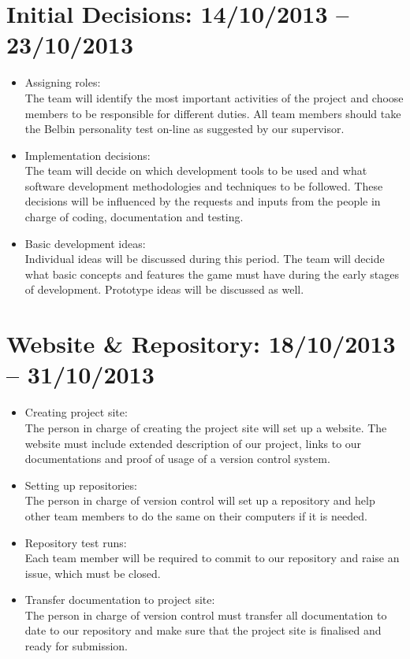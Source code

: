 \section{Initial Decisions: 14/10/2013 -- 23/10/2013} 
\begin{itemize}
\item{Assigning roles:\\The team will identify the most important activities of the project and choose members to be responsible for different duties. All team members should take the Belbin personality test on-line as suggested by our supervisor.}

\item{Implementation decisions:\\The team will decide on which development tools to be used and what software development methodologies and techniques to be followed. These decisions will be influenced by the requests and inputs from the people in charge of coding, documentation and testing.}

\item{Basic development ideas:\\Individual ideas will be discussed during this period. The team will decide what basic concepts and features the game must have during the early stages of development. Prototype ideas will be discussed as well.}
\end{itemize}

\section{Website \& Repository: 18/10/2013 -- 31/10/2013}
\begin{itemize}
\item{Creating project site:\\The person in charge of creating the project site will set up a website. The website must include extended description of our project, links to our documentations and proof of usage 
of a version control system.}

\item{Setting up repositories:\\The person in charge of version control will set up a repository and help other team members to do the same on their computers if it is needed.}

\item{Repository test runs:\\Each team member will be required to commit to our repository and raise an issue, which must be closed.}

\item{Transfer documentation to project site:\\The person in charge of version control must transfer all documentation to date to our repository and make sure that the project site is finalised and ready for submission.}
\end{itemize}

